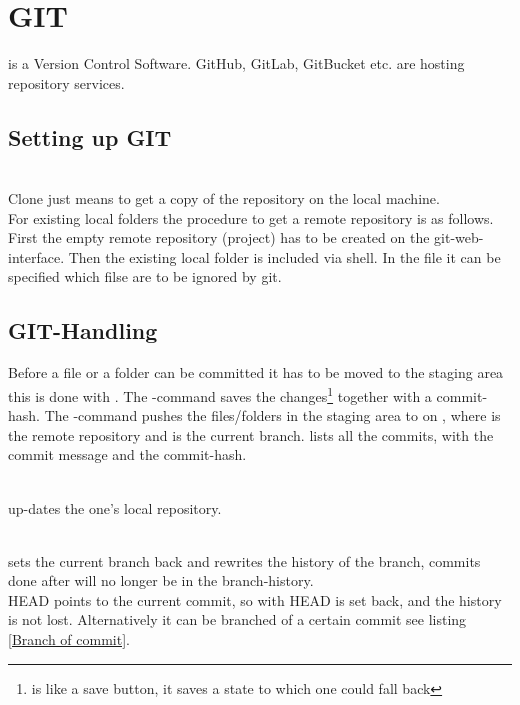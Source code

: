 \chapter{GIT}
 is a Version Control Software. GitHub, GitLab, GitBucket etc. are hosting repository services.
\section{Setting up GIT}
\\
Clone just means to get a copy of the repository on the local machine.
\\
For existing local folders the procedure to get a remote repository is as follows. First the empty remote repository (project)  has to be created on the git-web-interface. Then the existing local folder is included via shell.
In the file  it can be specified which filse are to be ignored by git.
\section{GIT-Handling}
Before a file or a folder can be committed it has to be moved to the staging area this is done with . The -command saves the changes\footnote{ is like a save button, it saves a state to which one could fall back} together with a commit-hash. The -command pushes the files/folders in the staging area to  on , where is the remote repository and  is the current branch.  
 lists all the commits, with the commit message and the commit-hash.


\\
 up-dates the one's local repository.

\\
 sets the current branch back and rewrites the history of the branch, commits done after  will no longer be in the branch-history.\\
HEAD points to the current commit, so with  HEAD is set back, and the history is not lost.
Alternatively it can be branched of a certain commit see listing \ref{Branch of commit}.

